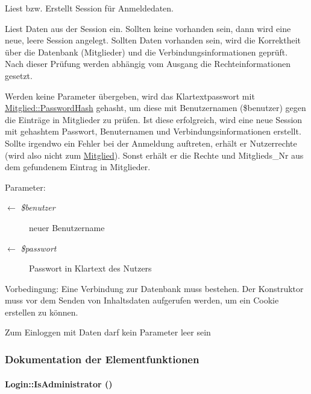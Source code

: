 Liest bzw. Erstellt Session für Anmeldedaten. 

Liest Daten aus der Session ein. Sollten keine vorhanden sein, dann wird eine neue, leere Session angelegt. Sollten Daten vorhanden sein, wird die Korrektheit über die Datenbank (Mitglieder) und die Verbindungsinformationen geprüft. Nach dieser Prüfung werden abhängig vom Ausgang die Rechteinformationen gesetzt.\par
 Werden keine Parameter übergeben, wird das Klartextpasswort mit \hyperlink{classMitglied_9b13db80866c22bf992e73f2eb75e369}{Mitglied::Password\-Hash} gehasht, um diese mit Benutzernamen (\$benutzer) gegen die Einträge in Mitglieder zu prüfen. Ist diese erfolgreich, wird eine neue Session mit gehashtem Passwort, Benuternamen und Verbindungsinformationen erstellt. Sollte irgendwo ein Fehler bei der Anmeldung auftreten, erhält er Nutzerrechte (wird also nicht zum \hyperlink{classMitglied}{Mitglied}). Sonst erhält er die Rechte und Mitglieds\_\-Nr aus dem gefundenem Eintrag in Mitglieder. \begin{Desc}
\item[Parameter:]
\begin{description}
\item[\mbox{$\leftarrow$} {\em \$benutzer}]neuer Benutzername \item[\mbox{$\leftarrow$} {\em \$passwort}]Passwort in Klartext des Nutzers \end{description}
\end{Desc}
\begin{Desc}
\item[Vorbedingung:]Eine Verbindung zur Datenbank muss bestehen. Der Konstruktor muss vor dem Senden von Inhaltsdaten aufgerufen werden, um ein Cookie erstellen zu können.\par
 Zum Einloggen mit Daten darf kein Parameter leer sein \end{Desc}


\subsubsection{Dokumentation der Elementfunktionen}
\hypertarget{classLogin_6c120224aa6719f58c6ccd08acc28758}{
\paragraph[IsAdministrator]{\setlength{\rightskip}{0pt plus 5cm}Login::Is\-Administrator ()}\hfill}
\label{classLogin_6c120224aa6719f58c6ccd08acc28758}


